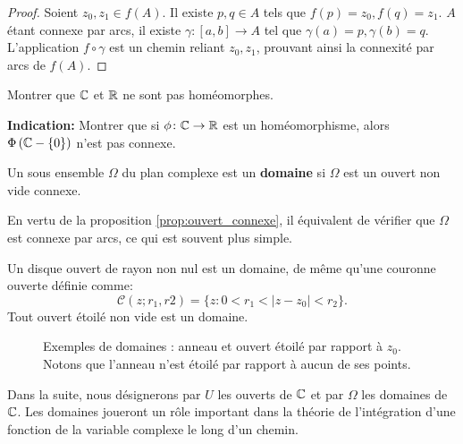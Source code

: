\begin{proof}
Soient $z_0,z_1 \in f(A)$. Il existe $p,q \in A$ tels que $f(p) =z_0, f(q)=z_1$. $A$ étant connexe par arcs, il existe $\gamma \colon [a,b] \to A$ tel que $\gamma(a) = p, \gamma(b) = q$. L'application $f \circ \gamma$ est un chemin reliant $z_0,z_1$, prouvant ainsi la connexité par arcs de $f(A)$.
\end{proof}
\begin{exercice}
    Montrer que $\mathbb{C}$ et $\mathbb R$ ne sont pas homéomorphes. 
    
    \textbf{Indication:} Montrer que si $\phi \colon \mathbb{C} \to \mathbb R$ est un homéomorphisme, alors $\Phi\left(\mathbb{C}-\{0\}\right)$ n'est pas connexe.    
\end{exercice}
\begin{fdefn} Un sous ensemble $\Omega$ du plan complexe est un \textbf{domaine} si $\Omega$ est un ouvert non vide connexe. 
\end{fdefn}
\begin{rem}
En vertu de la proposition \ref{prop:ouvert_connexe}, il équivalent de vérifier que $\Omega$ est connexe par arcs, ce qui est souvent plus simple.
\end{rem}

Un disque ouvert de rayon non nul est un domaine, de même qu'une couronne ouverte définie comme:
\[
\mathcal{C}(z;r_1,r2) =  \{ z : 0<r_1 <\lvert z-z_0 \rvert <r_2\}. 
 \]
 Tout ouvert étoilé non vide est un domaine.


\begin{figure}[H]
\begin{center}
\shorthandoff{!}\shorthandoff{:}
\shorthandon{!}\shorthandoff{:}
\caption{Exemples de domaines : anneau et ouvert étoilé par rapport à $z_0$. Notons que l'anneau n'est étoilé par rapport à aucun de ses points.}\label{fig:domaines}
\end{center}
\end{figure}
 Dans la suite, nous désignerons par $U$ les ouverts de $\mathbb{C}$ et par $\Omega$ les domaines de $\mathbb{C}$. Les domaines joueront un rôle important dans la théorie de l'intégration d'une fonction de la variable complexe le long d'un chemin.



